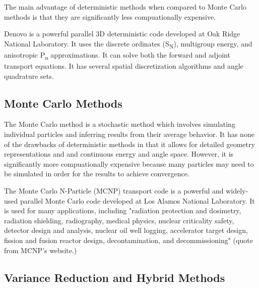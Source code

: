 The main advantage of deterministic methods when compared to Monte Carlo methods is that they are significantly less compuationally expensive.

Denovo \cite{denovo} is a powerful parallel 3D deterministic code developed at Oak Ridge National Laboratory.
It uses the discrete ordinates (S\textsubscript{N}), multigroup energy, and anisotropic P\textsubscript{n} approximations.
It can solve both the forward and adjoint transport equations.
It has several spatial discretization algorithms and angle quadrature sets.

\subsection{Monte Carlo Methods}
\label{sec:bg:rt:mc}

The Monte Carlo method is a stochastic method which involves simulating individual particles and inferring results from their average behavior.
It has none of the drawbacks of deterministic methods in that it allows for detailed geometry representations and and continuous energy and angle space.
However, it is significantly more compuationally expensive because many particles may need to be simulated in order for the results to achieve convergence.

The Monte Carlo N-Particle (MCNP) transport code \cite{mcnp620} is a powerful and widely-used parallel Monte Carlo code developed at Los Alamos National Laboratory.
It is used for many applications, including "radiation protection and dosimetry, radiation shielding, radiography, medical physics, nuclear criticality safety, detector design and analysis, nuclear oil well logging, accelerator target design, fission and fusion reactor design, decontamination, and decommissioning" (quote from MCNP's website.)

\subsection{Variance Reduction and Hybrid Methods}
\label{sec:bg:rt:vr}

\cite{advantg}
